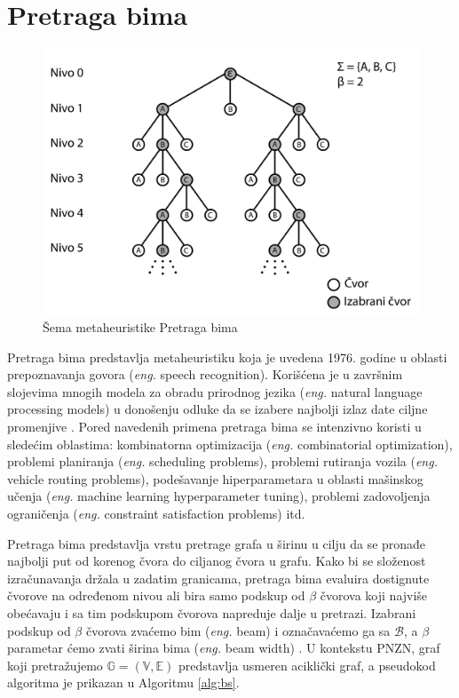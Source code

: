 \documentclass[12pt,oneside]{memoir}
\begin{document}
\section{Pretraga bima}
\label{sec:pretragaBima}
\begin{figure}[!ht]
  \centering
  \includegraphics[width=1\textwidth]{Slike/bs1.png}
  \caption{Šema metaheuristike Pretraga bima} 
  \label{fig:pretragaBima}
\end{figure}
Pretraga bima predstavlja metaheuristiku koja je uvedena 1976. godine u oblasti prepoznavanja govora
(\textit{eng.} speech recognition). Korišćena je u završnim slojevima mnogih modela za
obradu prirodnog jezika (\textit{eng.} natural language processing models) u donošenju odluke da se izabere najbolji
izlaz date ciljne promenjive \cite{BSIntroduction}. Pored navedenih primena pretraga bima se intenzivno koristi u sledećim
oblastima: kombinatorna optimizacija (\textit{eng.} combinatorial optimization), problemi planiranja (\textit{eng.} scheduling problems),
problemi rutiranja vozila (\textit{eng.} vehicle routing problems), podešavanje hiperparametara u oblasti mašinskog učenja
(\textit{eng.} machine learning hyperparameter tuning), problemi zadovoljenja ograničenja (\textit{eng.} constraint satisfaction problems) itd. 

Pretraga bima predstavlja vrstu pretrage grafa u širinu u cilju da
se pronađe najbolji put od korenog čvora do ciljanog čvora u grafu. Kako bi se složenost izračunavanja držala u
zadatim granicama, pretraga bima evaluira dostignute čvorove na određenom nivou ali bira samo podskup od $\beta$
čvorova koji najviše obećavaju i sa tim podskupom čvorova napreduje dalje u pretrazi. Izabrani podskup od $\beta$ čvorova
zvaćemo bim (\textit{eng.} beam) i označavaćemo ga sa $\mathcal{B}$, a $\beta$ parametar ćemo zvati širina bima (\textit{eng.} beam width) \cite{SCSBS}.
U kontekstu PNZN, graf koji pretražujemo $\mathbb{G}=(\mathbb{V},\mathbb{E})$ predstavlja usmeren aciklički graf, 
a pseudokod algoritma je prikazan u Algoritmu \ref{alg:bs}.
\end{document}
